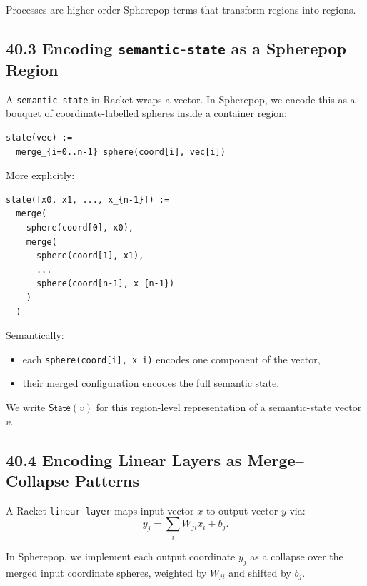 \documentclass[12pt,letterpaper]{article}
\theoremstyle{remark}
\begin{document}
Processes are higher-order Spherepop terms that transform regions into regions.

\subsection{40.3 Encoding \texttt{semantic-state} as a Spherepop Region}

A \texttt{semantic-state} in Racket wraps a vector. In Spherepop, we encode this as a bouquet of coordinate-labelled spheres inside a container region:

\begin{verbatim}
state(vec) :=
  merge_{i=0..n-1} sphere(coord[i], vec[i])
\end{verbatim}

More explicitly:

\begin{verbatim}
state([x0, x1, ..., x_{n-1}]) :=
  merge(
    sphere(coord[0], x0),
    merge(
      sphere(coord[1], x1),
      ...
      sphere(coord[n-1], x_{n-1})
    )
  )
\end{verbatim}

Semantically:

\begin{itemize}
  \item each \verb|sphere(coord[i], x_i)| encodes one component of the vector,
  \item their merged configuration encodes the full semantic state.
\end{itemize}

We write $\mathsf{State}(v)$ for this region-level representation of a semantic-state vector $v$.

\subsection{40.4 Encoding Linear Layers as Merge--Collapse Patterns}

A Racket \texttt{linear-layer} maps input vector $x$ to output vector $y$ via:
\[
y_j = \sum_i W_{ji} x_i + b_j.
\]

In Spherepop, we implement each output coordinate $y_j$ as a collapse over the merged input coordinate spheres, weighted by $W_{ji}$ and shifted by $b_j$.
\end{document}
